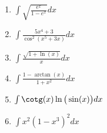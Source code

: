 \begin{exercice}
\begin{multicols}{3}
\begin{enumerate}
\item
$\int \sqrt{\frac{ e^x }{ 1-e^x }} dx$
\item
$\int \frac{ 5x^4+3 }{ \cos^2(x^5+3x) } dx$
\item
$\int \frac{ \sqrt{1+\ln(x)} }{ x } dx$
\item
$\int \frac{ 1-\arctan(x) }{ 1+x^2 } dx$
\item
$\int \cotg(x)\ln\big( \sin(x) \big) dx$
\item
$\int x^2(1-x^3)^2 dx$


\end{enumerate}
\end{multicols}

\end{exercice}
